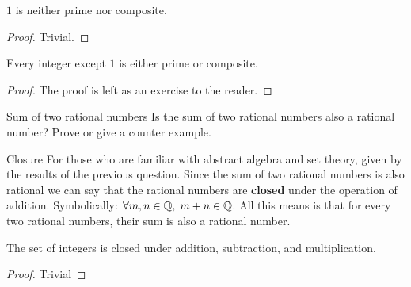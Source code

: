 \begin{tcolorbox}[colback=pink!70]
\begin{theorem}
    $1$ is neither prime nor composite.
\end{theorem}
\begin{proof}
    Trivial.
\end{proof}
\end{tcolorbox}

\begin{tcolorbox}[colback=orange!70]
\begin{lemma}
    Every integer except $1$ is either prime or composite. 
\end{lemma}
\begin{proof}
    The proof is left as an exercise to the reader.
\end{proof}
\end{tcolorbox}

\begin{question}{Sum of two rational numbers}{}
    Is the sum of two rational numbers also a rational number? Prove or give a counter example.
\end{question}

\begin{fact}{Closure}{}
    For those who are familiar with abstract algebra and set theory, given by the results of the previous question. Since the sum of two rational numbers is also rational we can say that the rational numbers are \textbf{closed} under the operation of addition. Symbolically: $\forall m, n \in \mathbb Q, \hspace{0.1cm} m + n \in \mathbb Q$. All this means is that for every two rational numbers, their sum is also a rational number. 
\end{fact}

\begin{tcolorbox}[colback=pink!70]
\begin{theorem}{\label{thm:intclosure}}
    The set of integers is closed under addition, subtraction, and multiplication.
\end{theorem}
\begin{proof}
    Trivial
\end{proof}
\end{tcolorbox}

